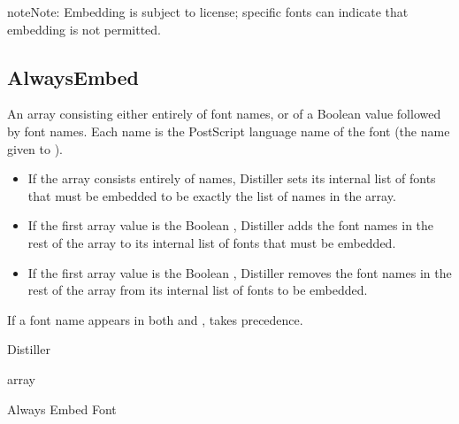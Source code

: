 \documentclass[letterpaper,12pt,english,openany,oneside]{sphinxmanual}
\begin{document}
\begin{sphinxadmonition}{note}{Note:}
Embedding is subject to license; specific fonts can indicate that embedding is not permitted.
\end{sphinxadmonition}




\subsection{AlwaysEmbed}
\label{\detokenize{PDF_Create_CommonSettings:alwaysembed}}
An array consisting either entirely of font names, or of a Boolean value followed by font names. Each name is the PostScript language name of the font (the name given to  ).
\begin{itemize}
\item {} 
If the array consists entirely of names, Distiller sets its internal list of fonts that must be embedded to be exactly the list of names in the array.

\item {} 
If the first array value is the Boolean  , Distiller adds the font names in the rest of the  array to its internal list of fonts that must be embedded.

\item {} 
If the first array value is the Boolean  , Distiller removes the font names in the rest of the  array from its internal list of fonts to be embedded.

\end{itemize}

If a font name appears in both  and  ,  takes precedence.

\label{\detokenize{PDF_Create_CommonSettings:supported-by-67}}

Distiller

\label{\detokenize{PDF_Create_CommonSettings:type-67}}

array

\label{\detokenize{PDF_Create_CommonSettings:ui-name-53}}

Always Embed Font
\end{document}
